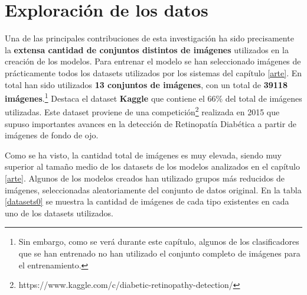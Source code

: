 \documentclass[
  12pt,
  spanish,
  a4paperpaper,
]{report}
\begin{document}
\hypertarget{exploraciuxf3n-de-los-datos}{%
\section{Exploración de los datos}\label{exploraciuxf3n-de-los-datos}}

Una de las principales contribuciones de esta investigación ha sido
precisamente la \textbf{extensa cantidad de conjuntos distintos de
imágenes} utilizados en la creación de los modelos. Para entrenar el
modelo se han seleccionado imágenes de prácticamente todos los datasets
utilizados por los sistemas del capítulo \ref{arte}. En total han sido
utilizados \textbf{13 conjuntos de imágenes}, con un total de
\textbf{39118 imágenes}.\footnote{Sin embargo, como se verá durante este
  capítulo, algunos de los clasificadores que se han entrenado no han
  utilizado el conjunto completo de imágenes para el entrenamiento.}
Destaca el dataset \textbf{Kaggle} que contiene el 66\% del total de
imágenes utilizadas. Este dataset proviene de una competición\footnote{https://www.kaggle.com/c/diabetic-retinopathy-detection/}
realizada en 2015 que supuso importantes avances en la detección de
Retinopatía Diabética a partir de imágenes de fondo de ojo.

Como se ha visto, la cantidad total de imágenes es muy elevada, siendo
muy superior al tamaño medio de los datasets de los modelos analizados
en el capítulo \ref{arte}. Algunos de los modelos creados han utilizado
grupos más reducidos de imágenes, seleccionadas aleatoriamente del
conjunto de datos original. En la tabla \ref{datasets0} se muestra la
cantidad de imágenes de cada tipo existentes en cada uno de los datasets
utilizados.
\end{document}
